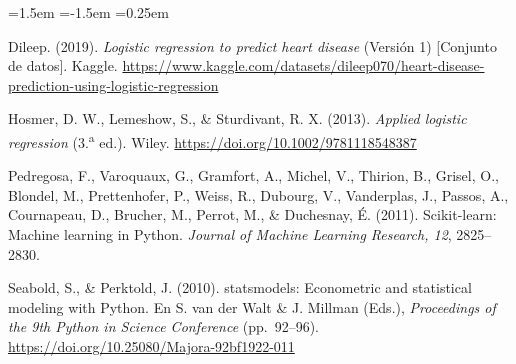 \documentclass[11pt,a4paper]{article}
\begin{document}
\begin{list}{}{\leftmargin=1.5em \itemindent=-1.5em \itemsep=0.25em \parsep=0pt}\small\raggedright
\item Dileep. (2019). \textit{Logistic regression to predict heart disease} (Versión 1) [Conjunto de datos]. Kaggle. \url{https://www.kaggle.com/datasets/dileep070/heart-disease-prediction-using-logistic-regression}
\item Hosmer, D. W., Lemeshow, S., \& Sturdivant, R. X. (2013). \textit{Applied logistic regression} (3.\textsuperscript{a} ed.). Wiley. \url{https://doi.org/10.1002/9781118548387}
\item Pedregosa, F., Varoquaux, G., Gramfort, A., Michel, V., Thirion, B., Grisel, O., Blondel, M., Prettenhofer, P., Weiss, R., Dubourg, V., Vanderplas, J., Passos, A., Cournapeau, D., Brucher, M., Perrot, M., \& Duchesnay, É. (2011). Scikit-learn: Machine learning in Python. \textit{Journal of Machine Learning Research, 12}, 2825--2830.
\item Seabold, S., \& Perktold, J. (2010). statsmodels: Econometric and statistical modeling with Python. En S. van der Walt \& J. Millman (Eds.), \textit{Proceedings of the 9th Python in Science Conference} (pp.~92--96). \url{https://doi.org/10.25080/Majora-92bf1922-011}
\end{list}
\end{document}
